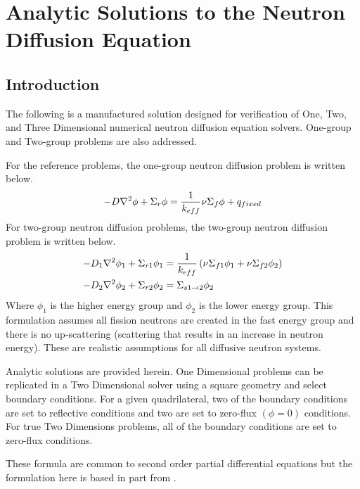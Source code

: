 \chapter{Analytic Solutions to the Neutron Diffusion Equation}

\section{Introduction}
  The following is a manufactured solution designed for verification of One,
  Two, and Three Dimensional numerical neutron diffusion equation solvers.
  One-group and Two-group problems are also addressed.
  
  For the reference problems, the one-group neutron diffusion problem is written
  below.
  \begin{equation} \label{eq:onegroup}
    -D \mathbf{\nabla}^2 \phi + \Sigma_r \phi =  \frac{1}{k_{eff}} \nu \Sigma_f \phi + 
      q_{fixed}
  \end{equation}
  For two-group neutron diffusion problems, the two-group neutron diffusion 
  problem is written below.
  \begin{align} 
    \label{eq:twogroup1}
    -D_1 \mathbf{\nabla}^2 \phi_1 + \Sigma_{r1} \phi_1 &= \frac{1}{k_{eff}} \left(
      \nu \Sigma_{f1} \phi_1 + \nu \Sigma_{f2} \phi_2 \right) \\
    \label{eq:twogroup2}
    -D_2 \mathbf{\nabla}^2 \phi_2 + \Sigma_{r2} \phi_2 &= 
      \Sigma_{s 1 \rightarrow 2} \phi_2
  \end{align}
  Where $\phi_1$ is the higher energy group and $\phi_2$ is the lower energy 
  group. This formulation assumes all fission neutrons are created in the fast 
  energy group and there is no up-scattering (scattering that results in an 
  increase in neutron energy). These are realistic assumptions for all diffusive
  neutron systems.

  Analytic solutions are provided herein. One Dimensional problems can be 
  replicated in a Two Dimensional solver using a square geometry and select 
  boundary conditions. For a given quadrilateral, two of the boundary conditions
  are set to reflective conditions and two are set to zero-flux $(\phi = 0)$ 
  conditions. For true Two Dimensions problems, all of the boundary conditions 
  are set to zero-flux conditions.
  
  These formula are common to second order partial differential equations but
  the formulation here is based in part from \cite{textbooklewis}.


